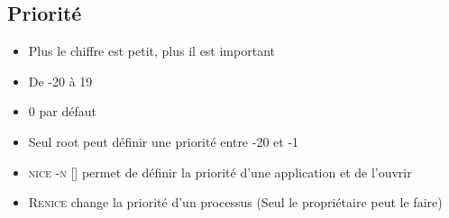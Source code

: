 \documentclass[a4paper]{article}
\begin{document}
      \subsection{Priorité}
      \begin{itemize}[label = \textbullet, font = \Large]
        \item Plus le chiffre est petit, plus il est important
        \item De -20 à 19
        \item 0 par défaut
        \item Seul root peut définir une priorité entre -20 et -1
        \item \textsc{nice -n []} permet de définir la priorité d'une application et de l'ouvrir
        \item \textsc{Renice} change la priorité d'un processus (Seul le propriétaire peut le faire)
      \end{itemize}
\end{document}

